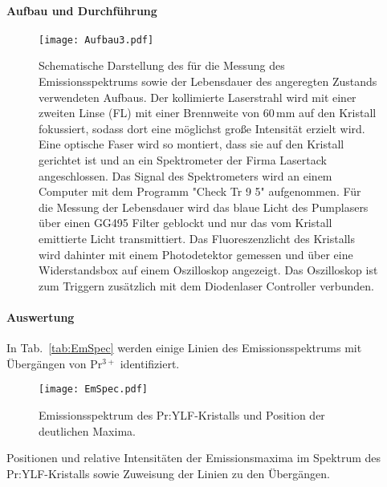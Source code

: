 \paragraph{Aufbau und Durchführung}

\begin{figure}[H]
\begin{center}
  \texttt{[image: Aufbau3.pdf]}
  \caption{Schematische Darstellung des für die Messung des Emissionsspektrums sowie der
  Lebensdauer des angeregten Zustands verwendeten Aufbaus.
  Der kollimierte Laserstrahl wird mit einer zweiten Linse (FL) mit einer Brennweite von 60\,mm auf
  den Kristall fokussiert, sodass dort eine möglichst große Intensität erzielt wird.
  Eine optische Faser wird so montiert, dass sie auf den Kristall gerichtet ist und an ein
  Spektrometer der Firma Lasertack angeschlossen.
  Das Signal des Spektrometers wird an einem Computer mit dem Programm "Check Tr 9 5" aufgenommen.
  Für die Messung der Lebensdauer wird das blaue Licht des Pumplasers über einen GG495 Filter
  geblockt und nur das vom Kristall emittierte Licht transmittiert.
  Das Fluoreszenzlicht des Kristalls wird dahinter mit einem Photodetektor gemessen und
  über eine Widerstandsbox auf einem Oszilloskop angezeigt.
  Das Oszilloskop ist zum Triggern zusätzlich mit dem Diodenlaser Controller verbunden.}
  \label{img:aufbau3}
\end{center}
\end{figure}




\paragraph{Auswertung}

In Tab.~\ref{tab:EmSpec} werden einige Linien des Emissionsspektrums mit Übergängen von Pr$^{3+}$
identifiziert.

\begin{figure}[H]
\begin{center}
  \texttt{[image: EmSpec.pdf]}
  \caption{Emissionsspektrum des Pr:YLF-Kristalls und Position der deutlichen Maxima.}
  \label{img:EmSpec}
\end{center}
\end{figure}

\begin{table}[htb]
\caption{Positionen und relative Intensitäten der Emissionsmaxima im Spektrum des
Pr:YLF-Kristalls sowie Zuweisung der Linien zu den Übergängen.}

\label{tab:EmSpec}
\end{table}


